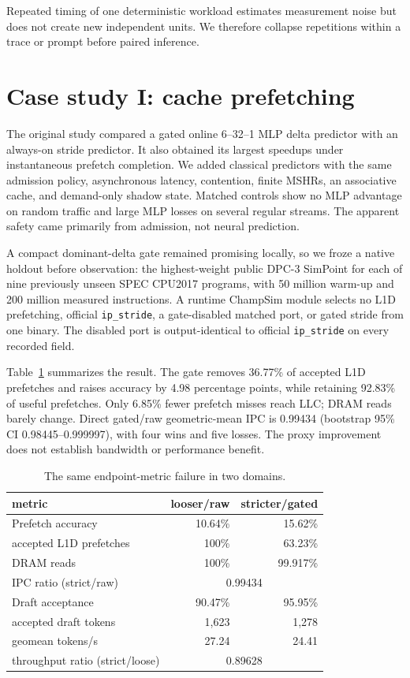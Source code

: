 \documentclass[conference]{IEEEtran}
\begin{document}
Repeated timing of one deterministic workload estimates measurement noise but
does not create new independent units. We therefore collapse repetitions
within a trace or prompt before paired inference.

\section{Case study I: cache prefetching}
The original study compared a gated online 6--32--1 MLP delta predictor with an
always-on stride predictor. It also obtained its largest speedups under
instantaneous prefetch completion. We added classical predictors with the same
admission policy, asynchronous latency, contention, finite MSHRs, an
associative cache, and demand-only shadow state. Matched controls show no MLP
advantage on random traffic and large MLP losses on several regular streams.
The apparent safety came primarily from admission, not neural prediction.

A compact dominant-delta gate remained promising locally, so we froze a native
holdout before observation: the highest-weight public DPC-3 SimPoint for each
of nine previously unseen SPEC CPU2017 programs, with 50 million warm-up and
200 million measured instructions. A runtime ChampSim module selects no L1D
prefetching, official \texttt{ip\_stride}, a gate-disabled matched port, or
gated stride from one binary. The disabled port is output-identical to official
\texttt{ip\_stride} on every recorded field.

Table~\ref{tab:cross} summarizes the result. The gate removes 36.77\% of
accepted L1D prefetches and raises accuracy by 4.98 percentage points, while
retaining 92.83\% of useful prefetches. Only 6.85\% fewer prefetch misses reach
LLC; DRAM reads barely change. Direct gated/raw geometric-mean IPC is 0.99434
(bootstrap 95\% CI 0.98445--0.999997), with four wins and five losses. The
proxy improvement does not establish bandwidth or performance benefit.

\begin{table}[t]
\centering\small
\caption{The same endpoint-metric failure in two domains.}
\label{tab:cross}
\begin{tabular}{lrr}
\toprule
metric & looser/raw & stricter/gated \\
\midrule
Prefetch accuracy & 10.64\% & 15.62\% \\
accepted L1D prefetches & 100\% & 63.23\% \\
DRAM reads & 100\% & 99.917\% \\
IPC ratio (strict/raw) & \multicolumn{2}{c}{0.99434} \\
\midrule
Draft acceptance & 90.47\% & 95.95\% \\
accepted draft tokens & 1,623 & 1,278 \\
geomean tokens/s & 27.24 & 24.41 \\
throughput ratio (strict/loose) & \multicolumn{2}{c}{0.89628} \\
\bottomrule
\end{tabular}
\end{table}
\end{document}

